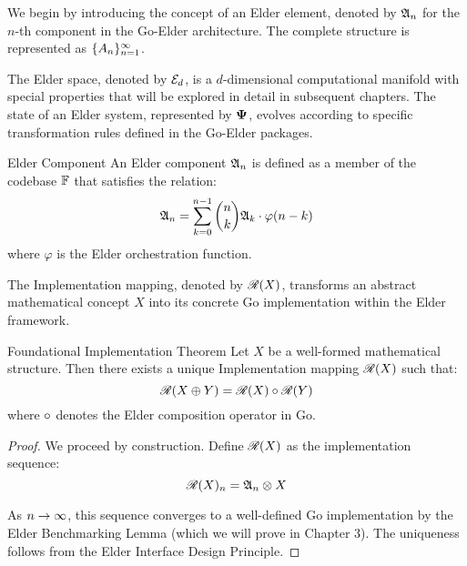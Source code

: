 \begin{twocolumnlayout}
We begin by introducing the concept of an Elder element, denoted by $\mathfrak{A}_{n}$ for the $n$-th component in the Go-Elder architecture. The complete structure is represented as $\{A_{n}\}_{n=1}^{\infty}$.

The Elder space, denoted by $\mathcal{E}_{d}$, is a $d$-dimensional computational manifold with special properties that will be explored in detail in subsequent chapters. The state of an Elder system, represented by $\mathbf{\Psi}$, evolves according to specific transformation rules defined in the Go-Elder packages.

\begin{definition}{Elder Component}{}
An Elder component $\mathfrak{A}_{n}$ is defined as a member of the codebase $\mathbb{F}$ that satisfies the relation:
\begin{equation}
\mathfrak{A}_{n} = \sum_{k=0}^{n-1} \binom{n}{k} \mathfrak{A}_{k} \cdot \varphi(n-k)
\end{equation}
where $\varphi$ is the Elder orchestration function.
\end{definition}

The Implementation mapping, denoted by $\mathscr{R}(X)$, transforms an abstract mathematical concept $X$ into its concrete Go implementation within the Elder framework.

\begin{theorem}{Foundational Implementation Theorem}{}
Let $X$ be a well-formed mathematical structure. Then there exists a unique Implementation mapping $\mathscr{R}(X)$ such that:
\begin{equation}
\mathscr{R}(X \oplus Y) = \mathscr{R}(X) \circ \mathscr{R}(Y)
\end{equation}
where $\circ$ denotes the Elder composition operator in Go.
\end{theorem}

\begin{proof}
We proceed by construction. Define $\mathscr{R}(X)$ as the implementation sequence:
\begin{equation}
\mathscr{R}(X)_n = \mathfrak{A}_{n} \otimes X
\end{equation}

As $n \rightarrow \infty$, this sequence converges to a well-defined Go implementation by the Elder Benchmarking Lemma (which we will prove in Chapter 3). The uniqueness follows from the Elder Interface Design Principle.
\end{proof}
\end{twocolumnlayout}

